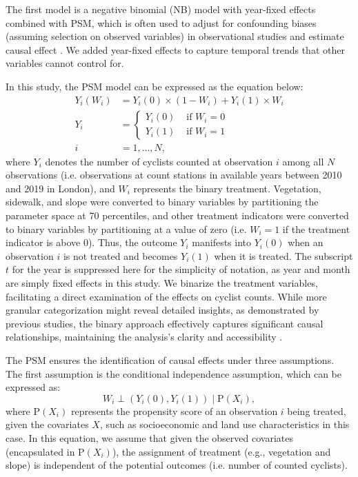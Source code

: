 \documentclass[preprint,12pt, authoryear]{elsarticle}
\begin{document}
The first model is a negative binomial (NB) model with year-fixed effects combined with PSM, which is often used to adjust for confounding biases (assuming selection on observed variables) in observational studies and estimate causal effect \citep{zhang_causal_2021}. We added year-fixed effects to capture temporal trends that other variables cannot control for.  

In this study, the PSM model can be expressed as the equation below:
\begin{equation}
\begin{aligned}
Y_i\left(W_i\right) &=Y_i(0) \times\left(1-W_i\right)+Y_i(1) \times W_i \\
Y_i &= \begin{cases}Y_i(0) & \text { if } W_i=0 \\
Y_i(1) & \text { if } W_i=1\end{cases} \\
i &=1, \ldots, N,
\end{aligned}
\end{equation}
where $Y_i$ denotes the number of cyclists counted at observation $i$ among all $N$ observations (i.e. observations at count stations in available years between 2010 and 2019 in London), and $W_i$ represents the binary treatment. Vegetation, sidewalk, and slope were converted to binary variables by partitioning the parameter space at 70 percentiles, and other treatment indicators were converted to binary variables by partitioning at a value of zero (i.e. $W_i=1$ if the treatment indicator is above 0). Thus, the outcome $Y_i$ manifests into $Y_i(0)$ when an observation $i$ is not treated and becomes $Y_i(1)$ when it is treated. The subscript $t$ for the year is suppressed here for the simplicity of notation, as year and month are simply fixed effects in this study.
We binarize the treatment variables, facilitating a direct examination of the effects on cyclist counts. 
While more granular categorization might reveal detailed insights, as demonstrated by previous studies, the binary approach effectively captures significant causal relationships, maintaining the analysis's clarity and accessibility \citep{silva_predicting_2015, frank_build_2021, liu_transitinduced_2023, fosgerau_bikeability_2023, calhoun_estimating_2024}.

The PSM ensures the identification of causal effects under three assumptions.
The first assumption is the conditional independence assumption, which can be expressed as:
\begin{equation}
W_i \perp\left(Y_i(0), Y_i(1)\right) \mid \mathrm{P}\left(X_i\right),
\end{equation}
where $\mathrm{P}\left(X_i\right)$ represents the propensity score of an observation $i$ being treated, given the covariates $X$, such as socioeconomic and land use characteristics in this case.
In this equation, we assume that given the observed covariates (encapsulated in $\mathrm{P}\left(X_i\right)$), the assignment of treatment (e.g., vegetation and slope) is independent of the potential outcomes (i.e. number of counted cyclists).
\end{document}
